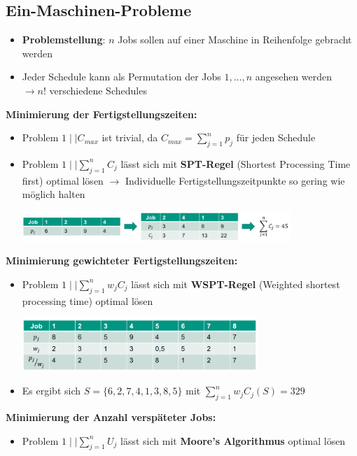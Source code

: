 \subsection{Ein-Maschinen-Probleme}
\begin{itemize}
	\item \textbf{Problemstellung}: $n$ Jobs sollen auf einer Maschine in
	Reihenfolge gebracht werden
	\item Jeder Schedule kann als Permutation der Jobs $1,\ldots,n$ angesehen
	werden \\
	$\rightarrow n!$ verschiedene Schedules
\end{itemize}
\bigskip
\textbf{Minimierung der Fertigstellungszeiten:}
\begin{itemize}
	\item Problem $1\mid\mid C_{max}$ ist trivial, da $C_{max}=\sum\limits_{j=1}^{n} p_j$ für jeden Schedule
	\item Problem $1\mid\mid \sum\limits_{j=1}^{n} C_j$ lässt sich mit \textbf{SPT-Regel} (Shortest Processing Time first) optimal lösen $\rightarrow$ Individuelle Fertigstellungszeitpunkte so gering wie möglich halten
	\begin{center}
		\includegraphics[width=0.8\textwidth]{images/spt.png}
	\end{center}
\end{itemize}
\bigskip
\textbf{Minimierung gewichteter Fertigstellungszeiten:}
\begin{itemize}
	\item Problem $1\mid\mid \sum\limits_{j=1}^{n} w_jC_j$ lässt sich mit \textbf{WSPT-Regel} (Weighted shortest processing time) optimal lösen
	\begin{center}
		\includegraphics[width=0.7\textwidth]{images/wspt.png}
	\end{center}
	\item Es ergibt sich $S=\{6,2,7,4,1,3,8,5\}$ mit $\sum\limits_{j=1}^{n} w_jC_j(S)=329$
\end{itemize}
\bigskip
\textbf{Minimierung der Anzahl verspäteter Jobs:}
\begin{itemize}
	\item Problem $1\mid\mid \sum\limits_{j=1}^{n} U_j$ lässt sich mit \textbf{Moore's Algorithmus} optimal lösen
	
\end{itemize}
